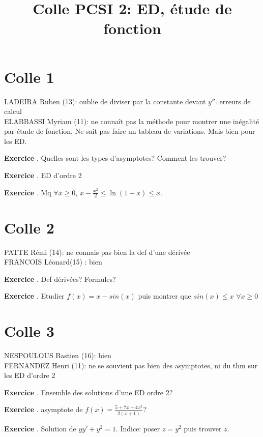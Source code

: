 \documentclass[10pt,a4paper]{article}
\title{Colle PCSI 2: ED, étude de fonction}
\newcounter{question}
\newcounter{exo}
\newenvironment{exo}{\vspace{0.5cm}\setcounter{question}{0}\addtocounter{exo}{1} \noindent \textbf{Exercice \theexo}. \normalsize }{\par}
\begin{document}
	\maketitle
	
	\section*{Colle 1}
	LADEIRA Ruben (13): oublie de diviser par la constante devant $y''$. erreurs de calcul\\
	ELABBASSI Myriam (11): ne connaît pas la méthode pour montrer une inégalité par étude de fonction. Ne sait pas faire un tableau de variations. Mais bien pour les ED.\\
	
	\begin{exo}
		Quelles sont les types d'asymptotes? Comment les trouver?
	\end{exo}

	\begin{exo}
		ED d'ordre 2
	\end{exo}
		
	\begin{exo}
		Mq $\forall x \geq 0$, $x - \frac{x^2}{2} \leq \ln(1+x) \leq x$.
	\end{exo}
	
	\section*{Colle 2}
	\setcounter{exo}{0}
	PATTE Rémi (14): ne connais pas bien la def d'une dérivée\\
	FRANCOIS Léonard(15) : bien\\
	
	\begin{exo}
		Def dérivées? Formules?
	\end{exo}

	\begin{exo}
		Etudier $f(x) = x - sin(x)$ puis montrer que $sin(x) \leq x$ $\forall x \geq 0$
	\end{exo}	
	
	\section*{Colle 3}
	\setcounter{exo}{0}
	NESPOULOUS Bastien (16): bien\\
	FERNANDEZ Henri (11): ne se souvient pas bien des asymptotes, ni du thm sur les ED d'ordre 2\\
	
	\begin{exo}
		Ensemble des solutions d'une ED ordre 2?
	\end{exo}

	\begin{exo}
		asymptote de $f(x) = \frac{5+7x+4x^2}{2(x+1)}$?
	\end{exo}	
	
	\begin{exo}
		Solution de $yy' + y^2 = 1$. Indice: poser $z = y^2$ puis trouver $z$.
	\end{exo}	
	 
\end{document}
